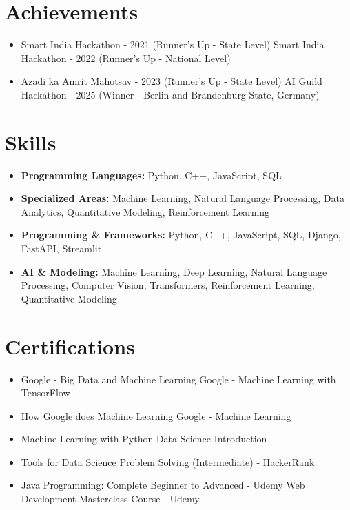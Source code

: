 \documentclass[a4paper,10pt]{article}
\begin{document}
\section*{Achievements}
\begin{itemize}
\item Smart India Hackathon - 2021 (Runner's Up - State Level) \hfill Smart India Hackathon - 2022 (Runner's Up - National Level)
\item Azadi ka Amrit Mahotsav - 2023 (Runner's Up - State Level) \hfill AI Guild Hackathon - 2025 (Winner - Berlin and Brandenburg State, Germany)
\end{itemize}

\section*{Skills}
\begin{itemize}
  \item \textbf{Programming Languages:} Python, C++, JavaScript, SQL
  \item \textbf{Specialized Areas:} Machine Learning, Natural Language Processing, Data Analytics, Quantitative Modeling, Reinforcement Learning
  \item \textbf{Programming \& Frameworks:} Python, C++, JavaScript, SQL, Django, FastAPI, Streamlit
  \item \textbf{AI \& Modeling:} Machine Learning, Deep Learning, Natural Language Processing, Computer Vision, Transformers, Reinforcement Learning, Quantitative Modeling
\end{itemize}

\section*{Certifications}
\begin{itemize}
\item Google - Big Data and Machine Learning \hfill Google - Machine Learning with TensorFlow
\item How Google does Machine Learning \hfill Google - Machine Learning
\item Machine Learning with Python \hfill Data Science Introduction
\item Tools for Data Science \hfill Problem Solving (Intermediate) - HackerRank
\item Java Programming: Complete Beginner to Advanced - Udemy \hfill Web Development Masterclass Course - Udemy
\end{itemize}
\end{document}
